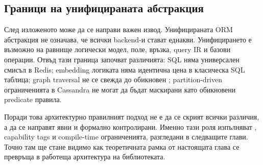 \subsection{Граници на унифицираната абстракция}

След изложеното може да се направи важен извод. Унифицираната ORM абстракция не означава, че всички backend-и стават еднакви. Унифицирането е възможно на равнище логически модел, поле, връзка, query IR и базови операции. Отвъд тази граница започват различията: SQL  няма универсален смисъл в Redis; embedding логиката няма идентична цена в класическа SQL таблица; graph traversal не се свежда до обикновен ; partition-driven ограниченията в Cassandra не могат да бъдат маскирани като обикновени predicate правила.

Поради това архитектурно правилният подход не е да се скрият всички различия, а да се направят явни и формално контролирани. Именно тази роля изпълняват , capability tags и compile-time ограниченията, разгледани в следващите глави. Точно там ще стане видимо как теоретичната рамка от настоящата глава се превръща в работеща архитектура на библиотеката.
